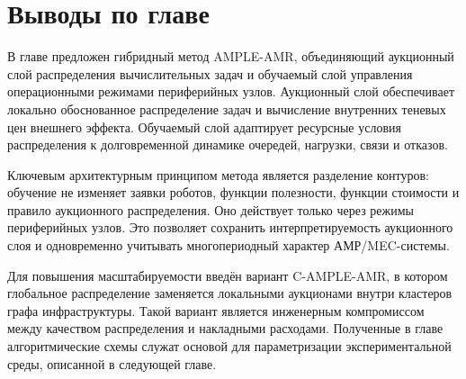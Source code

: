 \section{Выводы по главе}

В главе предложен гибридный метод AMPLE-AMR, объединяющий аукционный слой распределения вычислительных задач и обучаемый слой управления операционными режимами периферийных узлов. Аукционный слой обеспечивает локально обоснованное распределение задач и вычисление внутренних теневых цен внешнего эффекта. Обучаемый слой адаптирует ресурсные условия распределения к долговременной динамике очередей, нагрузки, связи и отказов.

Ключевым архитектурным принципом метода является разделение контуров: обучение не изменяет заявки роботов, функции полезности, функции стоимости и правило аукционного распределения. Оно действует только через режимы периферийных узлов. Это позволяет сохранить интерпретируемость аукционного слоя и одновременно учитывать многопериодный характер АМР/MEC-системы.

Для повышения масштабируемости введён вариант C-AMPLE-AMR, в котором глобальное распределение заменяется локальными аукционами внутри кластеров графа инфраструктуры. Такой вариант является инженерным компромиссом между качеством распределения и накладными расходами. Полученные в главе алгоритмические схемы служат основой для параметризации экспериментальной среды, описанной в следующей главе.

